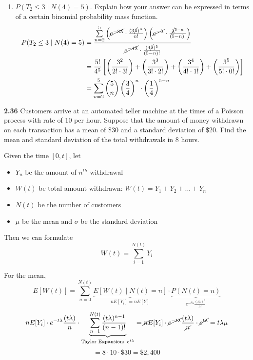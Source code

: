 \documentclass[12pt]{article}
\begin{document}
\begin{enumerate}[label=(\alph*)]
    \vspace{2\baselineskip}
    \item $P(T_2\le 3\;|\; N(4)=5).$ Explain how your answer can be expressed in terms of a certain binomial probability mass function.
    \begin{align}
        P(T_2\le 3\;|\; N(4)=5)&=\frac{\sum\limits_{n=2}^5\left(\cancel{e^{-3\lambda}}\cdot \frac{(3\cancel{\lambda})^n}{n!}\right)
       \left(\cancel{e^{-\lambda}}\cdot \frac{\cancel{\lambda}^{5-n}}{(5-n)!}\right)}{\cancel{e^{-4\lambda}}\cdot\frac{(4\cancel{\lambda})^5}{(5-n)!}} \nonumber \\
       &=\frac{5!}{4^5}\left[
       \left(\frac{3^2}{2!\cdot 3!}\right)+\left(\frac{3^3}{3!\cdot 2!}\right)
       +\left(\frac{3^4}{4!\cdot 1!}\right)+\left(\frac{3^5}{5!\cdot 0!}\right)
       \right] \nonumber \\
       &= \sum\limits_{n=2}^5 \binom{5}{n}\left(\frac{3}{4}\right)^n\cdot \left(\frac{1}{4}\right)^{5-n} \nonumber
    \end{align}
    
    
   
\end{enumerate}

\newpage
{\bf 2.36 } Customers arrive at an automated teller machine at the times of a Poisson process with rate of 10 per hour. Suppose that the amount of money withdrawn on each transaction has a mean of \$30 and a standard deviation of \$20. Find the mean and standard deviation of the total withdrawals in 8 hours.

\vspace{1\baselineskip}
Given the time $[0,t]$, let 
\begin{itemize}
    \item $Y_n$ be the amount of $n^{th}$ withdrawal
    \item $W(t)$ be total amount withdrawn: $W(t)=Y_1+Y_2+...+Y_n$
    \item $N(t)$ be the number of customers
    \item $\mu$ be the mean and $\sigma$ be the standard deviation
\end{itemize}
Then we can formulate $$W(t)=\sum\limits_{i=1}^{N(t)} Y_i$$

For the mean,
$$E[W(t)] 
= \sum\limits_{n=0}^{N(t)} \underbrace{E\left[W(t)\;|\;N(t)=n\right]}_{nE[Y_i]=nE[Y]} \cdot \underbrace{P(N(t)=n)}_{e^{-t\lambda}\frac{(t\lambda)^{n}}{n!}}$$
$$nE[Y_i]\cdot e^{-t\lambda}\frac{(t\lambda)}{n}\cdot \underbrace{\sum\limits_{n=1}^{N(t)}\frac{(t\lambda)^{n-1}}{(n-1)!}}_{\text{Taylor Expansion: }e^{t\lambda}}
=\cancel{n}E[Y_i]\cdot \cancel{e^{-t\lambda}}\frac{(t\lambda)}{\cancel{n}}\cdot \cancel{e^{t\lambda}}=t\lambda \mu$$
$$=8\cdot10\cdot \$30 = \$2,400 $$
\end{document}
